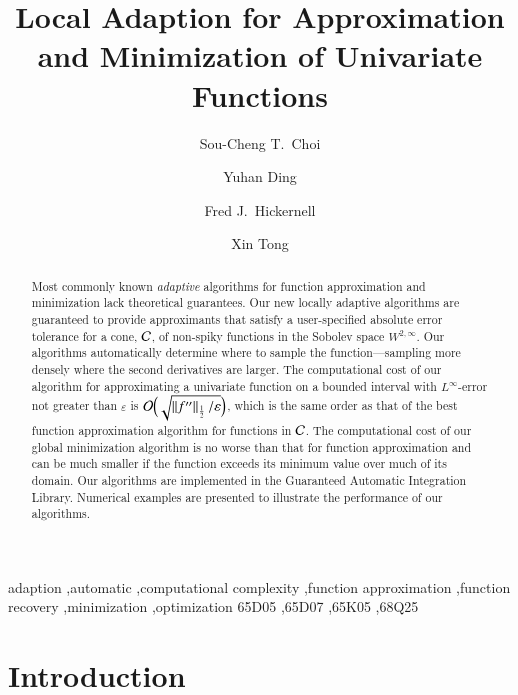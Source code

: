 \documentclass[review]{elsarticle}
\newcommand{\abstol}{\varepsilon}
\theoremstyle{definition}
\renewcommand{\cw}{W}
\begin{document}
\begin{frontmatter}

\title{Local Adaption for Approximation and Minimization of Univariate Functions}


\author{Sou-Cheng T.~Choi}
\author{Yuhan Ding}
\author{Fred J.~Hickernell}
\address{Department of Applied Mathematics, Illinois Institute of Technology, RE 208, 10 West 32$^{\text{nd}}$ Street, Chicago, Illinois, 60616, USA}
\author{Xin Tong}
\address{Department of Mathematics, Statistics, and Computer Science, University of Illinois at Chicago, Room 322 SEO, 851 S. Morgan Street, Chicago, Illinois, 60607, USA}



\begin{abstract}
Most commonly known \emph{adaptive} algorithms for function approximation and
minimization lack theoretical guarantees. Our new locally adaptive algorithms
are guaranteed to provide approximants that satisfy a user-specified absolute
error tolerance for a cone, $\mathcal{C}$, of non-spiky functions in the Sobolev space
$\cw^{2,\infty}$. Our algorithms automatically determine where to sample the
function---sampling more densely where the second derivatives are larger. The
computational cost of our algorithm for approximating a univariate function on a
bounded interval with $L^{\infty}$-error not greater than $\abstol$ is
$\Order\Bigl(\sqrt{\norm[\frac12]{f''}/\abstol}\Bigr)$, which is the
same order as that of the best function approximation algorithm for functions in
$\mathcal{C}$. The computational cost of our global minimization algorithm is no worse
than that for function approximation and can be much smaller if the
function exceeds its minimum value over much of its domain. Our
algorithms are implemented in the Guaranteed Automatic Integration
Library. Numerical examples are presented to illustrate the performance of our
algorithms.
\end{abstract}

\begin{keyword}
adaption \sep automatic \sep computational complexity \sep function approximation \sep function recovery \sep minimization \sep optimization
\MSC[2010]  65D05 \sep 65D07 \sep 65K05 \sep 68Q25
\end{keyword}

\end{frontmatter}

\section{Introduction} \label{sec:intro}
\end{document}
